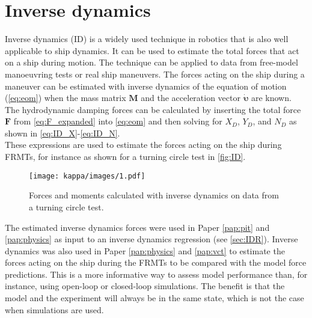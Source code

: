 \section{Inverse dynamics} \label{sec:ID}
Inverse dynamics (ID) is a widely used technique in robotics \cite{faberInverseDynamicsMechanical2018, haningerNonparametricInverseDynamic2019, mastalliInverseDynamicsMPCNullspace2023, sunHighorderInverseDynamics2023, kurtzInverseDynamicsTrajectory2023} that is also well applicable to ship dynamics. It can be used to estimate the total forces that act on a ship during motion. The technique can be applied to data from free-model manoeuvring tests or real ship maneuvers. The forces acting on the ship during a maneuver can be estimated with inverse dynamics of the equation of motion (\autoref{eq:eom}) when the mass matrix $\mathbf{M}$ and the acceleration vector $\pmb{\dot{\upsilon}}$ are known. The hydrodynamic damping forces can be calculated by inserting the total force $\mathbf{F}$ from \autoref{eq:F_expanded} into \autoref{eq:eom} and then solving for $X_D$, $Y_D$, and $N_D$ as shown in \autoref{eq:ID_X}-\autoref{eq:ID_N}.
\begin{equation}
    \label{eq:ID_X}
    
\end{equation}
\begin{equation}
    \label{eq:ID_Y}
    
\end{equation}
\begin{equation}
    \label{eq:ID_N}
    
\end{equation}
These expressions are used to estimate the forces acting on the ship during FRMTs, for instance as shown for a turning circle test in \autoref{fig:ID}.
\begin{figure}[H]
    \centering
    \texttt{[image: kappa/images/1.pdf]}
    \caption{Forces and moments calculated with inverse dynamics on data from a turning circle test.}
    \label{fig:ID}
\end{figure}

The estimated inverse dynamics forces were used in Paper \ref{pap:pit} and \ref{pap:physics} as input to an inverse dynamics regression (see \autoref{sec:IDR}). 
Inverse dynamics was also used in Paper \ref{pap:physics} and \ref{pap:vct} to estimate the forces acting on the ship during the FRMTs to be compared with the model force predictions. This is a more informative way to assess model performance than, for instance, using open-loop or closed-loop simulations. The benefit is that the model and the experiment will always be in the same state, which is not the case when simulations are used.